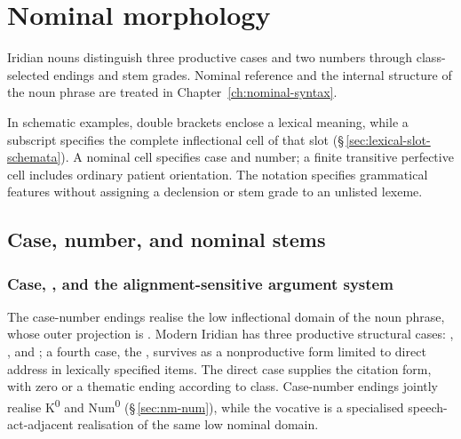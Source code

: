 \chapter{Nominal morphology}\label{ch:nominal-morphology}

Iridian nouns distinguish three productive cases and two numbers through
class-selected endings and stem grades. Nominal reference and the internal
structure of the noun phrase are treated in Chapter~\ref{ch:nominal-syntax}.

In schematic examples, double brackets enclose a lexical meaning, while a
subscript specifies the complete inflectional cell of that slot
(§\,\ref{sec:lexical-slot-schemata}). A nominal cell specifies case and
number; a finite transitive perfective cell includes ordinary patient
orientation. The notation specifies grammatical
features without assigning a declension or stem grade to an unlisted lexeme.

\section{Case, number, and nominal stems}
\label{sec:nm-case}

\subsection{Case, , and the alignment-sensitive argument system}
\label{sec:nm-case-system}

The case-number endings realise the low inflectional domain of the noun
phrase, whose outer projection is . Modern Iridian has three productive
structural cases: ,
, and ; a fourth case, the ,
survives as a nonproductive form limited to direct address in lexically
specified items. The direct case supplies the citation form, with zero or a thematic ending
according to class. Case-number endings jointly realise
K\textsuperscript{0} and Num\textsuperscript{0}
(§\,\ref{sec:nm-num}), while the vocative is a specialised
speech-act-adjacent realisation of the same low nominal domain.

